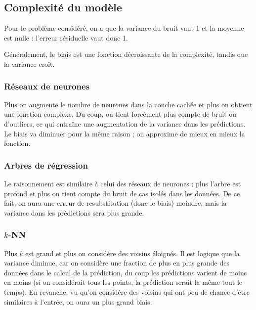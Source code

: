 		\subsection{Complexité du modèle}
		
		Pour le problème considéré, on a que la variance du bruit vaut 1 et la moyenne est nulle : l'erreur résiduelle vaut donc 1.
		
		
		Généralement, le biais est une fonction décroissante de la complexité, tandis que la variance croît.
		
			\subsubsection{Réseaux de neurones}
		
			
			Plus on augmente le nombre de neurones dans la couche cachée et plus on obtient une fonction complexe. Du coup, on tient forcément plus compte de bruit ou d'outliers, ce qui entraîne une augmentation de la variance dans les prédictions. Le biais va diminuer pour la même raison ; on approxime de mieux en mieux la fonction.
		
			\subsubsection{Arbres de régression}
			
			
			Le raisonnement est similaire à celui des réseaux de neurones : plus l'arbre est profond et plus on tient compte du bruit de cas isolés dans les données. De ce fait, on aura une erreur de resubstitution (donc le biais) moindre, mais la variance dans les prédictions sera plus grande.
			
			\subsubsection{$k$-NN}
			
			
			Plus $k$ est grand et plus on considère des voisins éloignés. Il est logique que la variance diminue, car on considère une fraction de plus en plus grande des données dans le calcul de la prédiction, du coup les prédictions varient de moins en moins (si on considérait tous les points, la prédiction serait la même tout le temps). En revanche, vu qu'on considère des voisins qui ont peu de chance d'être similaires à l'entrée, on aura un plus grand biais.
		
